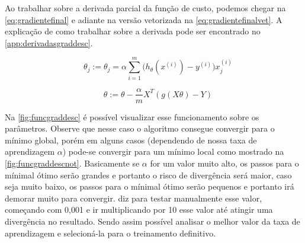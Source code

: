 Ao trabalhar sobre a derivada parcial da função de custo, podemos chegar na \autoref{eq:gradientefinal} e adiante na versão vetorizada na \autoref{eq:gradientefinalvet}. A explicação de como trabalhar sobre a derivada pode ser encontrado no \autoref{app:derivadasgraddesc}.

\begin{equation}
\quad \theta_j := \theta_j = \alpha \sum\limits_{i=1}^{m}\Big(h_{\theta}(x^{(i)}) - y^{(i)} \Big) x_j^{(i)} \label{eq:gradientefinal}
\end{equation}

\begin{equation}
\quad \theta := \theta - \frac{\alpha}{m}X^T(g(X\theta) - Y) \label{eq:gradientefinalvet}
\end{equation}

Na \autoref{fig:funcgraddesc} é possível visualizar esse funcionamento sobre os parâmetros. Observe que nesse caso o algoritmo consegue convergir para o mínimo global, porém em alguns casos (dependendo de nossa taxa de aprendizagem $ \alpha $) pode-se convergir para um mínimo local como mostrado na \autoref{fig:funcgraddescnot}. Basicamente se $\alpha$ for um valor muito alto, os passos para o mínimal ótimo serão grandes e portanto o risco de divergência será maior, caso seja muito baixo, os passos para o mínimal ótimo serão pequenos e portanto irá demorar muito para convergir.  diz para testar manualmente esse valor, começando com 0,001 e ir multiplicando por 10 esse valor até atingir uma divergência no resultado. Sendo assim possível analisar o melhor valor da taxa de aprendizagem e selecioná-la para o treinamento definitivo.

